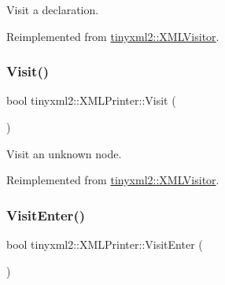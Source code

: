 Visit a declaration. 



Reimplemented from \mbox{\hyperlink{classtinyxml2_1_1_x_m_l_visitor_adc75bd459fc7ba8223b50f0616767f9a}{tinyxml2\+::\+X\+M\+L\+Visitor}}.

\mbox{\label{classtinyxml2_1_1_x_m_l_printer_ab8af5455bbf9e4be2663e6642fcd7e32}} 
\subsubsection{\texorpdfstring{Visit()}{Visit()}\hspace{0.1cm}{\footnotesize\ttfamily [4/4]}}
{\footnotesize\ttfamily bool tinyxml2\+::\+X\+M\+L\+Printer\+::\+Visit (\begin{DoxyParamCaption}\item[{const \mbox{\hyperlink{classtinyxml2_1_1_x_m_l_unknown}{X\+M\+L\+Unknown}} \&}]{ }\end{DoxyParamCaption})\hspace{0.3cm}{\ttfamily [virtual]}}



Visit an unknown node. 



Reimplemented from \mbox{\hyperlink{classtinyxml2_1_1_x_m_l_visitor_a14e4748387c34bf53d24e8119bb1f292}{tinyxml2\+::\+X\+M\+L\+Visitor}}.

\mbox{\label{classtinyxml2_1_1_x_m_l_printer_a9aa1de11a55a07db55a90fde37d7afad}} 
\subsubsection{\texorpdfstring{Visit\+Enter()}{VisitEnter()}\hspace{0.1cm}{\footnotesize\ttfamily [1/2]}}
{\footnotesize\ttfamily bool tinyxml2\+::\+X\+M\+L\+Printer\+::\+Visit\+Enter (\begin{DoxyParamCaption}\item[{const \mbox{\hyperlink{classtinyxml2_1_1_x_m_l_document}{X\+M\+L\+Document}} \&}]{ }\end{DoxyParamCaption})\hspace{0.3cm}{\ttfamily [virtual]}}




